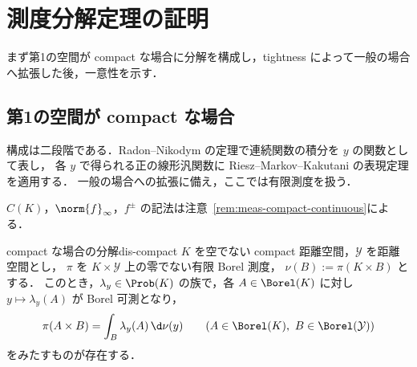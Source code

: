 \section{測度分解定理の証明}

まず第1の空間が compact な場合に分解を構成し，tightness によって一般の場合へ拡張した後，一意性を示す．

\subsection{第1の空間が compact な場合}

構成は二段階である．Radon--Nikodym の定理で連続関数の積分を $y$ の関数として表し，
各 $y$ で得られる正の線形汎関数に Riesz--Markov--Kakutani の表現定理を適用する．
一般の場合への拡張に備え，ここでは有限測度を扱う．

$C(K)$，$\norm{f}_\infty$，$f^\pm$ の記法は注意~\ref{rem:meas-compact-continuous}による．

\begin{lemma}{compact な場合の分解}{dis-compact}
  $K$ を空でない compact 距離空間，$\mathcal{Y}$ を距離空間とし，
  $\pi$ を $K\times\mathcal{Y}$ 上の零でない有限 Borel 測度，
  $\nu(B):=\pi(K\times B)$ とする．
  このとき，$\lambda_y\in\Prob(K)$ の族で，各 $A\in\Borel(K)$ に対し $y\mapsto\lambda_y(A)$ が Borel 可測となり，
  \[
    \pi(A\times B)=\int_B\lambda_y(A)\,\d\nu(y)
    \qquad(A\in\Borel(K),\ B\in\Borel(\mathcal{Y}))
  \]
  をみたすものが存在する．
\end{lemma}

